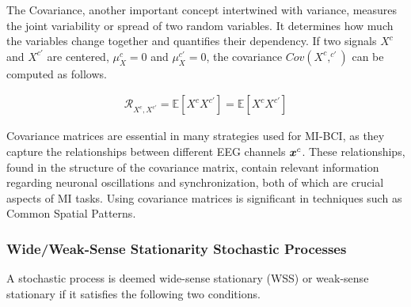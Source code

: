 The Covariance, another important concept intertwined with variance, measures the joint variability or spread of two random variables. It determines how much the variables change together and quantifies their dependency. If two signals $X^c$ and $X^{c'}$ are centered, $\mu_X^{c}=0$ and $\mu_X^{c'}=0$, the covariance $Cov(X^{c},^{c'})$ can be computed as follows.

\begin{equation}
  \begin{split}
    \mathcal{R}_{X^{c},X^{c'}} = \mathbb{E} \left[ X^{c} X^{c'}  \right] = \mathbb{E} \left[ X^{c} X^{c'} \right]
  \end{split}
\end{equation}

Covariance matrices are essential in many strategies used for MI-BCI, as they capture the relationships between different EEG channels $\bm {x}^c$. These relationships, found in the structure of the covariance matrix, contain relevant information regarding neuronal oscillations and synchronization, both of which are crucial aspects of MI tasks. Using covariance matrices is significant in techniques such as Common Spatial Patterns.

\subsubsection{Wide/Weak-Sense Stationarity Stochastic Processes}

A stochastic process is deemed wide-sense stationary (WSS) or weak-sense stationary if it satisfies the following two conditions.

